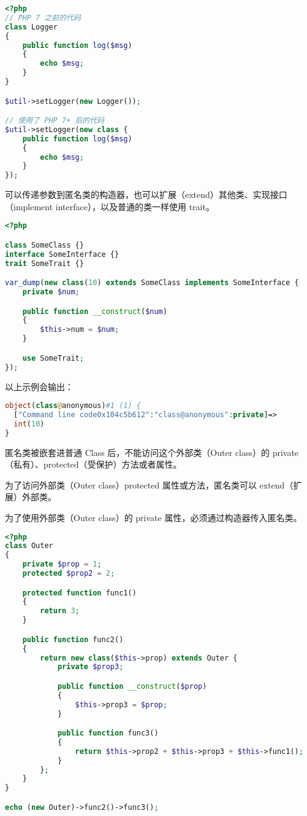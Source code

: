\begin{lstlisting}[language=PHP]
<?php
// PHP 7 之前的代码
class Logger
{
    public function log($msg)
    {
        echo $msg;
    }
}

$util->setLogger(new Logger());

// 使用了 PHP 7+ 后的代码
$util->setLogger(new class {
    public function log($msg)
    {
        echo $msg;
    }
});
\end{lstlisting}

可以传递参数到匿名类的构造器，也可以扩展（extend）其他类、实现接口（implement interface），以及普通的类一样使用 trait。




\begin{lstlisting}[language=PHP]
<?php

class SomeClass {}
interface SomeInterface {}
trait SomeTrait {}

var_dump(new class(10) extends SomeClass implements SomeInterface {
    private $num;

    public function __construct($num)
    {
        $this->num = $num;
    }

    use SomeTrait;
});
\end{lstlisting}

以上示例会输出：


\begin{lstlisting}[language=PHP]
object(class@anonymous)#1 (1) {
  ["Command line code0x104c5b612":"class@anonymous":private]=>
  int(10)
}
\end{lstlisting}

匿名类被嵌套进普通 Class 后，不能访问这个外部类（Outer class）的 private（私有）、protected（受保护）方法或者属性。 

\begin{compactitem}
\item 为了访问外部类（Outer class）protected 属性或方法，匿名类可以 extend（扩展）外部类。 
\item 为了使用外部类（Outer class）的 private 属性，必须通过构造器传入匿名类。
\end{compactitem}


\begin{lstlisting}[language=PHP]
<?php
class Outer
{
    private $prop = 1;
    protected $prop2 = 2;

    protected function func1()
    {
        return 3;
    }

    public function func2()
    {
        return new class($this->prop) extends Outer {
            private $prop3;

            public function __construct($prop)
            {
                $this->prop3 = $prop;
            }

            public function func3()
            {
                return $this->prop2 + $this->prop3 + $this->func1();
            }
        };
    }
}

echo (new Outer)->func2()->func3();
\end{lstlisting}


